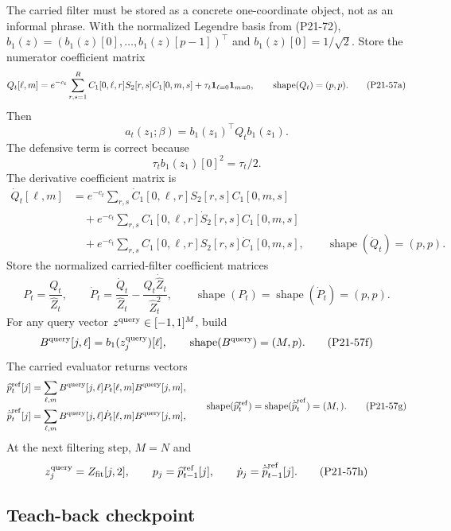 \documentclass[11pt]{article}
\newcommand{\widehatZ}{\widehat Z}
\newcommand{\shape}{\operatorname{shape}}
\begin{document}
The carried filter must be stored as a concrete one-coordinate object, not as
an informal phrase.  With the normalized Legendre basis from (P21-72),
\(b_1(z)=(b_1(z)[0],\ldots,b_1(z)[p-1])^\top\) and \(b_1(z)[0]=1/\sqrt2\).
Store the numerator coefficient matrix
\[
    Q_t[\ell,m]
    =
    e^{-c_t}\sum_{r,s=1}^{R}
    C_1[0,\ell,r]S_2[r,s]C_1[0,m,s]
    +\tau_t{\bf 1}_{\ell=0}{\bf 1}_{m=0},
    \qquad
    \shape(Q_t)=(p,p).
    \tag{P21-57a}
\]
Then
\[
    a_t(z_1;\beta)=b_1(z_1)^\top Q_t b_1(z_1).
    \tag{P21-57b}
\]
The defensive term is correct because
\[
    \tau_t b_1(z_1)[0]^2=\tau_t/2.
    \tag{P21-57c}
\]
The derivative coefficient matrix is
\[
\begin{aligned}
    \dot Q_t[\ell,m]
    &=
    e^{-c_t}\sum_{r,s}
    \dot C_1[0,\ell,r]S_2[r,s]C_1[0,m,s]\\
    &\quad+
    e^{-c_t}\sum_{r,s}
    C_1[0,\ell,r]\dot S_2[r,s]C_1[0,m,s]\\
    &\quad+
    e^{-c_t}\sum_{r,s}
    C_1[0,\ell,r]S_2[r,s]\dot C_1[0,m,s],
    \qquad
    \shape(\dot Q_t)=(p,p).
\end{aligned}
\tag{P21-57d}
\]
Store the normalized carried-filter coefficient matrices
\[
    P_t=\frac{Q_t}{\widehatZ_t},
    \qquad
    \dot P_t=
    \frac{\dot Q_t}{\widehatZ_t}
    -
    \frac{Q_t\dot{\widehatZ}_t}{\widehatZ_t^2},
    \qquad
    \shape(P_t)=\shape(\dot P_t)=(p,p).
    \tag{P21-57e}
\]
For any query vector \(z^{\rm query}\in[-1,1]^M\), build
\[
    B^{\rm query}[j,\ell]=b_1(z^{\rm query}_j)[\ell],
    \qquad
    \shape(B^{\rm query})=(M,p).
    \tag{P21-57f}
\]
The carried evaluator returns vectors
\[
\begin{aligned}
    \widehat p_t^{\rm ref}[j]
    &=
    \sum_{\ell,m}B^{\rm query}[j,\ell]P_t[\ell,m]
    B^{\rm query}[j,m],\\
    \dot{\widehat p}_t^{\rm ref}[j]
    &=
    \sum_{\ell,m}B^{\rm query}[j,\ell]\dot P_t[\ell,m]
    B^{\rm query}[j,m],
\end{aligned}
\qquad
\shape(\widehat p_t^{\rm ref})=\shape(\dot{\widehat p}_t^{\rm ref})=(M,).
\tag{P21-57g}
\]
At the next filtering step, \(M=N\) and
\[
    z^{\rm query}_j=Z_{\rm fit}[j,2],
    \qquad
    p_j=\widehat p_{t-1}^{\rm ref}[j],
    \qquad
    \dot p_j=\dot{\widehat p}_{t-1}^{\rm ref}[j].
    \tag{P21-57h}
\]

\subsection*{Teach-back checkpoint}
\end{document}
